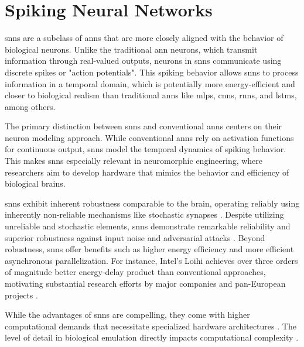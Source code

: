 \section{Spiking Neural Networks}


\glspl{snn} are a subclass of \glspl{ann} that are more closely aligned with the behavior of biological neurons. Unlike the traditional \gls{ann} neurons, which transmit information through real-valued outputs, neurons in \glspl{snn} communicate using discrete spikes or "action potentials". This spiking behavior allows \glspl{snn} to process information in a temporal domain, which is potentially more energy-efficient and closer to biological realism than traditional \glspl{ann} like \glspl{mlp}, \glspl{cnn}, \glspl{rnn}, and \glspl{lstm}, among others.

The primary distinction between \glspl{snn} and conventional \glspl{ann} centers on their neuron modeling approach. While conventional \glspl{ann} rely on activation functions for continuous output, \glspl{snn} model the temporal dynamics of spiking behavior. This makes \glspl{snn} especially relevant in neuromorphic engineering, where researchers aim to develop hardware that mimics the behavior and efficiency of biological brains.

\glspl{snn} exhibit inherent robustness comparable to the brain, operating reliably using inherently non-reliable mechanisms like stochastic synapses \cite{smetters1996synaptic}. Despite utilizing unreliable and stochastic elements, \glspl{snn} demonstrate remarkable reliability \cite{mcdonnell2011benefits} and superior robustness against input noise and adversarial attacks \cite{ernst2007efficient, Dapello2020.06.16.154542}. Beyond robustness, \glspl{snn} offer benefits such as higher energy efficiency and more efficient asynchronous parallelization. For instance, Intel's Loihi \cite{davies2018loihi} achieves over three orders of magnitude better energy-delay product than conventional approaches, motivating substantial research efforts by major companies and pan-European projects \cite{Spinnaker_TransSolid_13}.

While the advantages of \glspl{snn} are compelling, they come with higher computational demands that necessitate specialized hardware architectures \cite{roy2019towards, bouvier2019spiking, young2019review, TrueNorth_Trans15, Spinnaker_TransSolid_13, davies2018loihi}. The level of detail in biological emulation directly impacts computational complexity \cite{izhikevich2004model, amunts2019human}.

